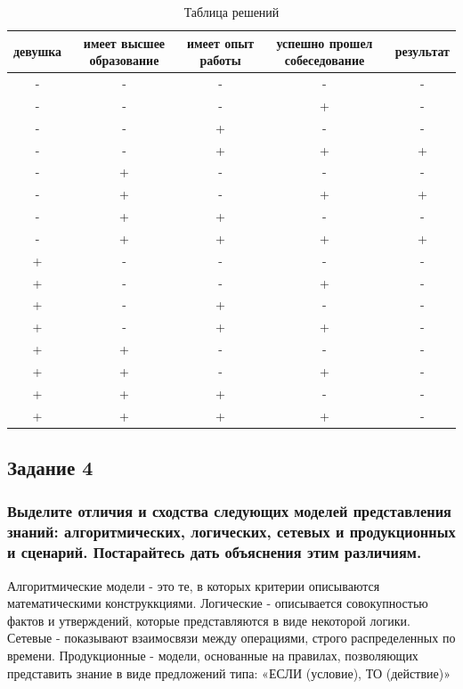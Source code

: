 \documentclass[14pt,a4paper,report]{report}
\begin{document}
\begin{table}[h!]
\centering
\bgroup
\def\arraystretch{1}
\begin{tabular}{ | c| c | c |c |c | }
\hline
девушка & имеет высшее образование & имеет опыт работы & успешно прошел собеседование & результат 
\\ \hline

- & - & - & - & - \\ \hline 
- & - & - & + & - \\ \hline
- & - & + & - & - \\ \hline 
- & - & + & + & + \\ \hline

- & + & - & - & - \\ \hline 
- & + & - & + & + \\ \hline
- & + & + & - & - \\ \hline 
- & + & + & + & + \\ \hline

+ & - & - & - & - \\ \hline
+ & - & - & + & - \\ \hline
+ & - & + & - & - \\ \hline
+ & - & + & + & - \\ \hline

+ & + & - & - & - \\ \hline
+ & + & - & + & - \\ \hline
+ & + & + & - & - \\ \hline
+ & + & + & + & - \\ \hline
\end{tabular}
\egroup
\caption{Таблица решений}
\label{table:1}
\end{table}

\subsection{Задание 4}

\subsubsection{Выделите отличия и сходства следующих моделей представления знаний: алгоритмических, логических, сетевых и продукционных и сценарий. Постарайтесь дать объяснения этим различиям.}

Алгоритмические модели - это те, в которых критерии описываются математическими конструккциями. Логические - описывается совокупностью фактов и утверждений, которые представляются в виде некоторой логики. Сетевые - показывают взаимосвязи между операциями, строго распределенных по времени. Продукционные - модели, основанные на правилах, позволяющих представить знание в виде предложений типа: «ЕСЛИ (условие), ТО (действие)» 
\end{document}
